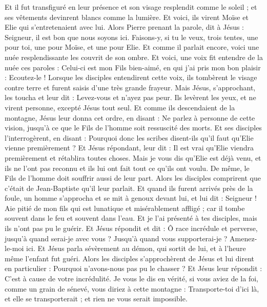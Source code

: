 \begin{multicols}{2}
Et il fut transfiguré en leur présence et son visage resplendit comme le soleil ; et ses vêtements devinrent blancs comme la lumière.
Et voici, ils virent Moïse et Elie qui s'entretenaient avec lui.
Alors Pierre prenant la parole, dit à Jésus : Seigneur, il est bon que nous soyons ici. Faisons-y, si tu le veux, trois tentes, une pour toi, une pour Moïse, et une pour Elie.
Et comme il parlait encore, voici une nuée resplendissante les couvrit de son ombre. Et voici, une voix fit entendre de la nuée ces paroles : Celui-ci est mon Fils bien-aimé, en qui j'ai pris mon bon plaisir : Ecoutez-le !
Lorsque les disciples entendirent cette voix, ils tombèrent le visage contre terre et furent saisis d'une très grande frayeur.
Mais Jésus, s'approchant, les toucha et leur dit : Levez-vous et n'ayez pas peur.
Ils levèrent les yeux, et ne virent personne, excepté Jésus tout seul.
Et comme ils descendaient de la montagne, Jésus leur donna cet ordre, en disant : Ne parlez à personne de cette vision, jusqu'à ce que le Fils de l'homme soit ressuscité des morts.
Et ses disciples l'interrogèrent, en disant : Pourquoi donc les scribes disent-ils qu'il faut qu'Elie vienne premièrement ?
Et Jésus répondant, leur dit : Il est vrai qu'Elie viendra premièrement et rétablira toutes choses.
Mais je vous dis qu'Elie est déjà venu, et ils ne l'ont pas reconnu et ils lui ont fait tout ce qu'ils ont voulu. De même, le Fils de l'homme doit souffrir aussi de leur part.
Alors les disciples comprirent que c'était de Jean-Baptiste qu'il leur parlait.
Et quand ils furent arrivés près de la foule, un homme s'approcha et se mit à genoux devant lui,
et lui dit : Seigneur ! Aie pitié de mon fils qui est lunatique et misérablement affligé ; car il tombe souvent dans le feu et souvent dans l'eau.
Et je l'ai présenté à tes disciples, mais ils n'ont pas pu le guérir.
Et Jésus répondit et dit : Ô race incrédule et perverse, jusqu'à quand serai-je avec vous ? Jusqu'à quand vous supporterai-je ? Amenez-le-moi ici.
Et Jésus parla sévèrement au démon, qui sortit de lui, et à l'heure même l'enfant fut guéri.
Alors les disciples s'approchèrent de Jésus et lui dirent en particulier : Pourquoi n'avons-nous pas pu le chasser ?
Et Jésus leur répondit : C'est à cause de votre incrédulité. Je vous le dis en vérité, si vous aviez de la foi, comme un grain de sénevé, vous diriez à cette montagne : Transporte-toi d'ici là, et elle se transporterait ; et rien ne vous serait impossible.

\end{multicols}
